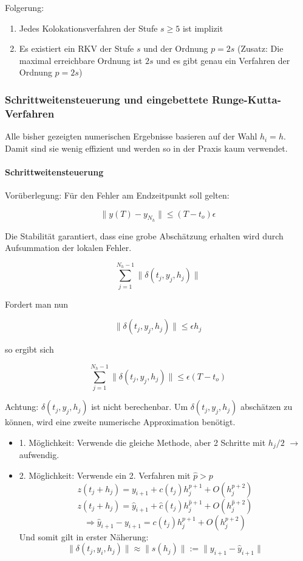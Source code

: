 Folgerung: 
\begin{enumerate}
	\item Jedes Kolokationsverfahren der Stufe $s \ge 5$ ist implizit
	\item Es existiert ein RKV der Stufe $s$ und der Ordnung $p=2s$ (Zusatz: Die maximal erreichbare Ordnung ist $2s$ und es gibt genau ein Verfahren der Ordnung $p=2s$)
\end{enumerate}

\subsubsection{Schrittweitensteuerung und eingebettete Runge-Kutta-Verfahren}

Alle bisher gezeigten numerischen Ergebnisse basieren auf der Wahl $h_i = h$. Damit sind sie wenig effizient und werden so in der Praxis kaum verwendet.

\paragraph{Schrittweitensteuerung}

Vorüberlegung: Für den Fehler am Endzeitpunkt soll gelten:

$$\|y(T) - y_{N_h}\| \le (T-t_o)\epsilon$$

Die Stabilität garantiert, dass eine grobe Abschätzung erhalten wird durch Aufsummation der lokalen Fehler.

$$\sum_{j=1}^{N_h-1} \| \delta(t_j, y_j, h_j) \|$$

Fordert man nun 

$$\|\delta(t_j, y_j, h_j)\| \le \epsilon h_j$$

so ergibt sich

$$\sum_{j=1}^{N_h-1} \|\delta(t_j, y_j, h_j)\| \le \epsilon (T-t_o)$$

Achtung: $\delta(t_j, y_j, h_j)$ ist nicht berechenbar. Um $\delta(t_j, y_j, h_j)$ abschätzen zu können, wird eine zweite numerische Approximation benötigt.

\begin{itemize}
	\item 1. Möglichkeit: Verwende die gleiche Methode, aber 2 Schritte mit $h_j/2$ $\rightarrow$ aufwendig.
	\item 2. Möglichkeit: Verwende ein 2. Verfahren mit $\hat{p} > p$
		$$z(t_j + h_j) = y_{i+1} + c(t_j)h_j^{p+1} + O(h_j^{p+2})$$
		$$z(t_j + h_j) = \hat{y}_{i+1} + \hat{c}(t_j)h_j^{\hat{p}+1} + O(h_j^{\hat{p}+2})$$
		$$\Rightarrow \hat{y}_{i+1} - y_{i+1} = c(t_j) h_j^{p+1} + O(h_j^{p+2})$$
		Und somit gilt in erster Näherung:
		$$\|\delta(t_j, y_i, h_j)\| \approx \|s(h_j)\| := \|y_{i+1} - \hat{y}_{i+1}\|$$
\end{itemize}

